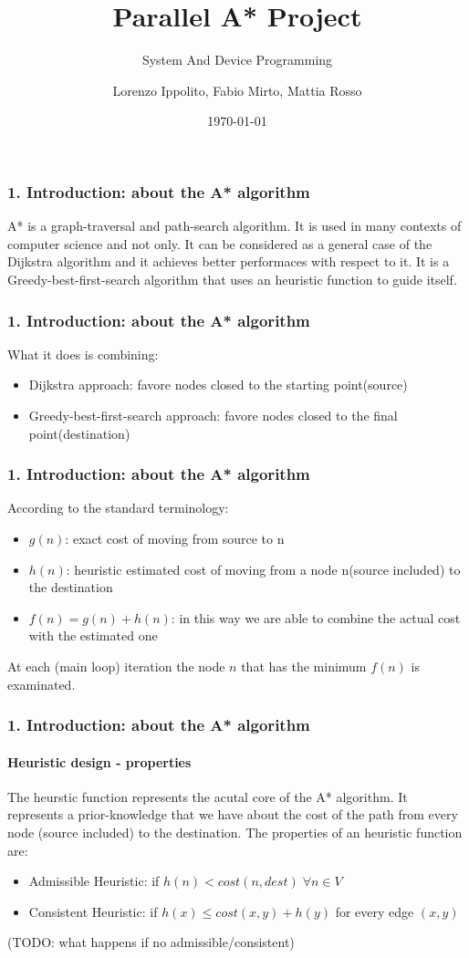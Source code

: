 \documentclass[12pt]{beamer}
\title{Parallel A* Project}
\subtitle{System And Device Programming}
\author{Lorenzo Ippolito, Fabio Mirto, Mattia Rosso}
\institute{Politecnico di Torino}
\date{\today}
\begin{document}
	\begin{frame}
		\titlepage
	\end{frame}
	\begin{frame}
		\frametitle{1. Introduction: about the A* algorithm}
		A* is a graph-traversal and path-search algorithm. It is used in many contexts of computer science and 
		not only. It can be considered as a general case of the Dijkstra algorithm and it achieves better performaces
		with respect to it. It is a Greedy-best-first-search algorithm that uses an heuristic function to guide
		itself.
	\end{frame}
	\begin{frame}
		\frametitle{1. Introduction: about the A* algorithm}
		What it does is combining:
		\begin{itemize}
			\item Dijkstra approach: favore nodes closed to the starting point(source)
			\item Greedy-best-first-search approach: favore nodes closed to the final point(destination)
		\end{itemize}
	\end{frame}
	\begin{frame}
		\frametitle{1. Introduction: about the A* algorithm}
		According to the standard terminology:
		\begin{itemize}
			\item $g(n)$: exact cost of moving from source to n
			\item $h(n)$: heuristic estimated cost of moving from a node n(source included) to the destination
			\item $f(n) = g(n) + h(n)$: in this way we are able to combine the actual cost with the estimated one
		\end{itemize}
		At each (main loop) iteration the node $n$ that has the minimum $f(n)$ is examinated.
	\end{frame}
	\begin{frame}
		\frametitle{1. Introduction: about the A* algorithm}
		\framesubtitle{Heuristic design - properties}
		The heurstic function represents the acutal core of the A* algorithm. It represents a prior-knowledge that
		we have about the cost of the path from every node (source included) to the destination. The properties
		of an heuristic function are:
		\begin{itemize}
		\item 	Admissible Heuristic: if $h(n) < cost(n, dest) \;\forall n \in V$
		\item 	Consistent Heuristic: if $h(x) \le cost(x, y) + h(y)$ for every edge $(x, y)$ 
		\end{itemize}
		(TODO: what happens if no admissible/consistent)
	\end{frame}
\end{document}
